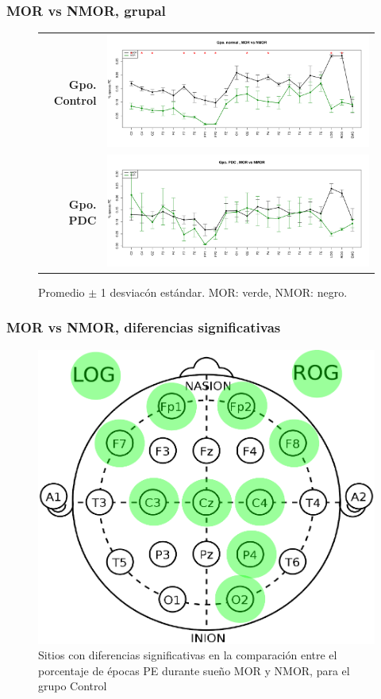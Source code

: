 \documentclass{beamer}
\begin{document}

\begin{frame}\frametitle{MOR vs NMOR, grupal}
\begin{figure}
\centering
\begin{tabular}{rl}
{\Large \textbf{Gpo. Control}}
&
\includegraphics[width=0.6\linewidth]
{./new170424/comp_etapas_gpos_NORMALMOR_vs_NMOR.pdf} 
\\
{\Large \textbf{Gpo. PDC}}
&
\includegraphics[width=0.6\linewidth]
{./new170424/comp_etapas_gpos_PDCMOR_vs_NMOR.pdf} 
\end{tabular}
\caption{ Promedio $\pm$ 1 desviac\'on est\'andar. MOR: verde, NMOR: negro.}
\end{figure}
\end{frame}


\begin{frame}\frametitle{MOR vs NMOR, diferencias significativas}
\begin{figure}
\centering
\includegraphics[width=0.4\linewidth]
{cabecita.pdf} 
\caption{Sitios con diferencias 
significativas en la comparaci\'on entre el porcentaje de \'epocas PE durante sue\~no MOR y NMOR, 
para el grupo Control}
\end{figure}
\end{frame}
\end{document}
